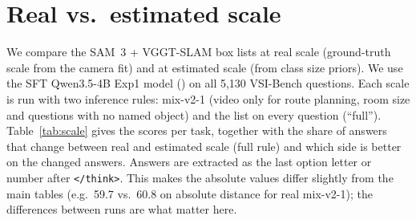 
\section{Real vs.\ estimated scale}
\label{sec:scale}

We compare the SAM~3 + VGGT-SLAM box lists at real scale (ground-truth scale from the camera fit) and at estimated scale
(from class size priors). We use the SFT Qwen3.5-4B Exp1 model
() on all 5,130 VSI-Bench questions. Each scale is run
with two inference rules: mix-v2-1 (video only for route planning, room size and questions with no named object) and
the list on every question (``full''). Table~\ref{tab:scale} gives the scores per task, together with the share of answers that
change between real and estimated scale (full rule) and which side is better on the changed answers.
Answers are extracted as the last option letter or number after \texttt{\textless/think\textgreater}. This makes the absolute values differ
slightly from the main tables (e.g.\ 59.7 vs.\ 60.8 on absolute distance for real mix-v2-1); the differences between runs
are what matter here.

